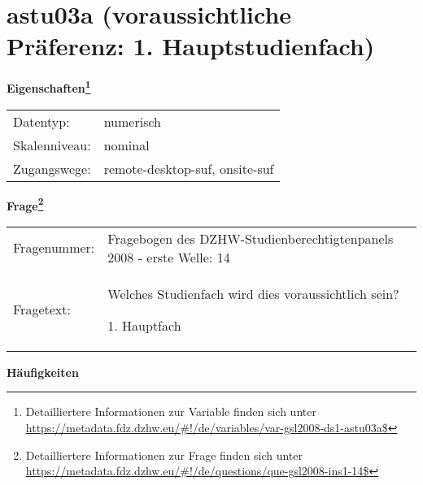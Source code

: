 
    \setcounter{footnote}{0}

    \vspace*{-1.8cm}
	\section{astu03a (voraussichtliche Präferenz: 1. Hauptstudienfach)}
	\label{section:astu03a}



    \vspace*{0.5cm}
    \noindent\textbf{Eigenschaften\footnote{Detailliertere Informationen zur Variable finden sich unter
		\url{https://metadata.fdz.dzhw.eu/\#!/de/variables/var-gsl2008-ds1-astu03a$}}}\\
	\begin{tabularx}{\hsize}{@{}lX}
	Datentyp: & numerisch \\
	Skalenniveau: & nominal \\
	Zugangswege: &
	  remote-desktop-suf, 
	  onsite-suf
 \\
    \end{tabularx}



				\vspace*{0.5cm}
                \noindent\textbf{Frage\footnote{Detailliertere Informationen zur Frage finden sich unter
		              \url{https://metadata.fdz.dzhw.eu/\#!/de/questions/que-gsl2008-ins1-14$}}}\\
				\begin{tabularx}{\hsize}{@{}lX}
					Fragenummer: &
					  Fragebogen des DZHW-Studienberechtigtenpanels 2008 - erste Welle:
					  14
 \\
					Fragetext: & Welches Studienfach wird dies voraussichtlich sein?\par  1. Hauptfach \\
				\end{tabularx}





        		\vspace*{0.5cm}
                \noindent\textbf{Häufigkeiten}

